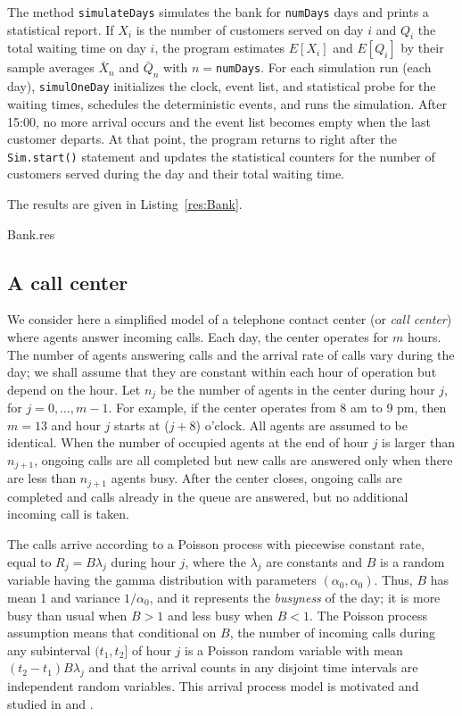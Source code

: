 The method \texttt{simulateDays} simulates the bank
for \texttt{numDays} days and prints a statistical report.
If $X_i$ is the number of customers served on day $i$ and
$Q_i$ the total waiting time on day $i$, the program estimates
$E[X_i]$ and $E[Q_i]$ by their sample averages $\bar X_n$ and
$\bar Q_n$ with $n = $\texttt{numDays}.
For each simulation run (each day), \texttt{simulOneDay} initializes
the clock, event list, and statistical probe for the waiting times,
schedules the deterministic events, and runs the simulation.
After 15:00, no more arrival occurs and the event list becomes
empty when the last customer departs.
At that point, the program returns to right after the \texttt{Sim.start()}
statement and updates the statistical counters for the number of
customers served during the day and their total waiting time.

The results are given in Listing~\ref{res:Bank}.

%
{Bank.res}


\subsection {A call center}
\label {sec:call-center}

We consider here a simplified model of a telephone contact center
(or \emph{call center}) where agents answer incoming calls.
Each day, the center operates for $m$ hours.
The number of agents answering calls and the arrival rate
of calls vary during the day; we shall assume that
they are constant within each hour of operation but depend on the hour.
Let $n_j$ be the number of agents in the center during hour $j$,
for $j=0,\dots,m-1$.
For example, if the center operates from 8 {\sc am} to 9 {\sc pm},
then $m=13$ and hour $j$ starts at ($j+8$) o'clock.
All agents are assumed to be identical.
When the number of occupied agents at the end of hour $j$ is larger
than $n_{j+1}$, ongoing calls are all completed but new calls are
answered only when there are less than $n_{j+1}$ agents busy.
After the center closes, ongoing calls are completed and calls already
in the queue are answered, but no additional incoming call is taken.

The calls arrive according to a Poisson process with piecewise constant rate,
equal to $R_j = B \lambda_j$ during hour $j$, where the $\lambda_j$
are constants and $B$ is a random variable having the gamma distribution
with parameters $(\alpha_0,\alpha_0)$.
Thus, $B$ has mean 1 and variance $1/\alpha_0$, and it
represents the \emph{busyness} of the day; it is more busy than usual
when $B > 1$ and less busy when $B < 1$.
The Poisson process assumption means that conditional on $B$,
the number of incoming calls during any subinterval $(t_1, t_2]$
of hour $j$ is a Poisson random variable with
mean $(t_2 - t_1) B \lambda_j$ and that the arrival counts in
any disjoint time intervals are independent random variables.
This arrival process model is motivated and studied in
\cite{ccWHI99c} and \cite{ccAVR04a}.

